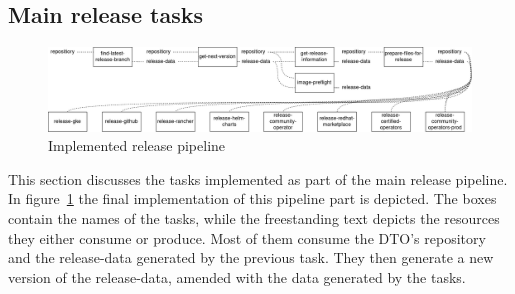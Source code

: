 \subsection{Main release tasks}\label{subsec:main-release-tasks}

\begin{figure}[H]
    \centering
    \includegraphics[width=\textwidth]{img/implementation/release-pipeline.drawio}
    \caption{Implemented release pipeline}
    \label{fig:implemented-release-pipeline}
\end{figure}

This section discusses the tasks implemented as part of the main release pipeline.
In figure~\ref{fig:implemented-release-pipeline} the final implementation of this pipeline part is depicted.
The boxes contain the names of the tasks, while the freestanding text depicts the resources they either consume or produce.
Most of them consume the DTO's repository and the release-data generated by the previous task.
They then generate a new version of the release-data, amended with the data generated by the tasks.
























